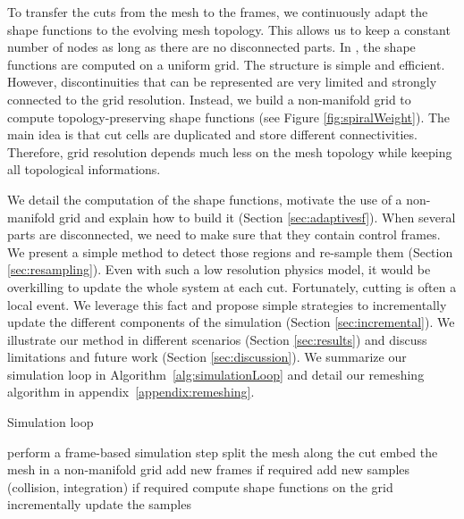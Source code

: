 \documentclass[11pt, oneside, a4paper]{memoir}
\begin{document}
To transfer the cuts from the mesh to the frames, we continuously adapt the shape functions to the evolving mesh topology. This allows us to keep a constant number of nodes as long as there are no disconnected parts. In \cite{Faure2011}, the shape functions are computed on a uniform grid. The structure is simple and efficient. However, discontinuities that can be represented are very limited and strongly connected to the grid resolution. Instead, we build a non-manifold grid to compute topology-preserving shape functions (see Figure \ref{fig:spiralWeight}). The main idea is that cut cells are duplicated and store different connectivities. Therefore, grid resolution depends much less on the mesh topology while keeping all topological informations.

We detail the computation of the shape functions, motivate the use of a non-manifold grid and explain how to build it (Section \ref{sec:adaptivesf}). When several parts are disconnected, we need to make sure that they contain control frames. We present a simple method to detect those regions and re-sample them (Section \ref{sec:resampling}). Even with such a low resolution physics model, it would be overkilling to update the whole system at each cut. Fortunately, cutting is often a local event. We leverage this fact and propose simple strategies to incrementally update the different components of the simulation (Section \ref{sec:incremental}). We illustrate our method in different scenarios (Section \ref{sec:results}) and discuss limitations and future work (Section \ref{sec:discussion}). We summarize our simulation loop in Algorithm~\ref{alg:simulationLoop} and detail our remeshing algorithm in appendix~\ref{appendix:remeshing}.

\begin{algorithm}[h]
\caption{\label{alg:simulationLoop}Simulation loop}
\begin{algorithmic}[0]
	\State perform a frame-based simulation step
	\State split the mesh along the cut
	\State embed the mesh in a non-manifold grid
	\State add new frames if required
	\State add new samples (collision, integration) if required
	\State compute shape functions on the grid
	\State incrementally update the samples
\EndFor
\end{algorithmic}
\end{algorithm}
\end{document}
